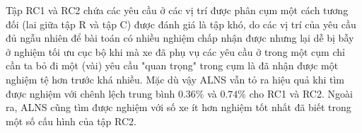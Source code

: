   Tập RC1 và RC2 chứa các yêu cầu ở các vị trí được phân cụm một cách tương đối (lai giữa tập R và tập C) được đánh giá là tập khó, do các vị trí của yêu cầu đủ ngẫu nhiên để bài toán có nhiều nghiệm chấp nhận được nhưng lại dễ bị bẫy ở nghiệm tối ưu cục bộ khi mà xe đã phụ vụ các yêu cầu ở trong một cụm chỉ cần ta bỏ đi một (vài) yêu cầu "quan trọng" trong cụm là đã nhận được một nghiệm tệ hơn trước khá nhiều. Mặc dù vậy ALNS vẫn tỏ ra hiệu quả khi tìm được nghiệm với chênh lệch trung bình $0.36\%$ và $0.74\%$ cho RC1 và RC2. Ngoài ra, ALNS cũng tìm được nghiệm với số xe ít hơn nghiệm tốt nhất đã biết trong một số cấu hình của tập RC2.